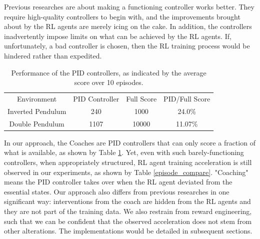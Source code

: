 \documentclass{IJCAS}
\begin{document}
Previous researches\cite{Xie2018LearningWT}\cite{Carlucho2017IncrementalQS}\cite{Pavse2020RIDMRI}\cite{Choi2017InverseRL} are about making a functioning controller works better. They require high-quality controllers to begin with, and the improvements brought about by the RL agents are merely icing on the cake. In addition, the controllers inadvertently impose limits on what can be achieved by the RL agents. If, unfortunately, a bad controller is chosen, then the RL training process would be hindered rather than expedited. 


\begin{table}
\footnotesize
\caption{Performance of the PID controllers, as indicated by the average score over 10 episodes.}
\label{score_compare}
\centering
\begin{tabular}{ cccc }
\rowcolor{airforceblue}
Environment & PID Controller &Full Score &PID\slash Full Score \\
Inverted Pendulum & 240 & 1000& 24.0\%\\
\rowcolor{beaublue}

Double Pendulum & 1107 & 10000& 11.07\%\\
\end{tabular}
\end{table}

In our approach, the Coaches are PID controllers that can only score a fraction of what is available, as shown by Table \ref{score_compare}. Yet, even with such barely-functioning controllers, when appropriately structured, RL agent training acceleration is still observed in our experiments, as shown by Table \ref{episode_compare}. "Coaching" means the PID controller takes over when the RL agent deviated from the essential states. Our approach also differs from previous researches in one significant way: interventions from the coach are hidden from the RL agents and they are not part of the training data. We also restrain from reward engineering, such that we can be confident that the observed acceleration does not stem from other alterations. The implementations would be detailed in subsequent sections.
\end{document}
